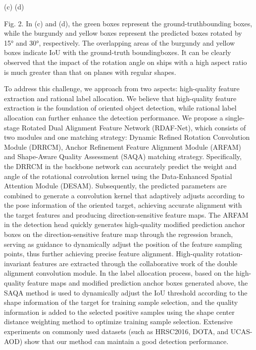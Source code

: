 \documentclass[journal]{IEEEtran}
\begin{document}
(c)                            (d)

Fig. 2. In (c) and (d), the green boxes represent the ground-truthbounding boxes, while the burgundy and yellow boxes represent the predicted boxes rotated by 15° and 30°, respectively. The overlapping areas of the burgundy and yellow boxes indicate IoU with the ground-truth boundingboxes. It can be clearly observed that the impact of the rotation angle on ships with a high aspect ratio is much greater than that on planes with regular shapes.

To address this challenge, we approach from two aspects: high-quality feature extraction and rational label allocation. We believe that high-quality feature extraction is the foundation of oriented object detection, while rational label allocation can further enhance the detection performance. We propose a single-stage Rotated Dual Alignment Feature Network (RDAF-Net), which consists of two modules and one matching strategy: Dynamic Refined Rotation Convolution Module (DRRCM), Anchor Refinement Feature Alignment Module (ARFAM) and Shape-Aware Quality Assessment (SAQA) matching strategy. Specifically, the DRRCM in the backbone network can accurately predict the weight and angle of the rotational convolution kernel using the Data-Enhanced Spatial Attention Module (DESAM). Subsequently, the predicted parameters are combined to generate a convolution kernel that adaptively adjusts according to the pose information of the oriented target, achieving accurate alignment with the target features and producing direction-sensitive feature maps. The ARFAM in the detection head quickly generates high-quality modified prediction anchor boxes on the direction-sensitive feature map through the regression branch, serving as guidance to dynamically adjust the position of the feature sampling points, thus further achieving precise feature alignment. High-quality rotation-invariant features are extracted through the collaborative work of the double alignment convolution module. In the label allocation process, based on the high-quality feature maps and modified prediction anchor boxes generated above, the SAQA method is used to dynamically adjust the IoU threshold according to the shape information of the target for training sample selection, and the quality information is added to the selected positive samples using the shape center distance weighting method to optimize training sample selection. Extensive experiments on commonly used datasets (such as HRSC2016, DOTA, and UCAS-AOD) show that our method can maintain a good detection performance.
\end{document}
